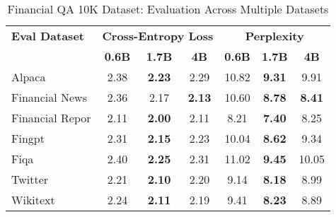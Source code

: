 
\begin{table}[h]
\centering
\caption[Financial QA 10K: Evaluation Results]{Financial QA 10K Dataset: Evaluation Across Multiple Datasets}
\label{tab:financial_qa_results}
\begin{tabular}{l|ccc|ccc}
\hline
\textbf{Eval Dataset} & \multicolumn{3}{c|}{\textbf{Cross-Entropy Loss}} & \multicolumn{3}{c}{\textbf{Perplexity}} \\
\cline{2-4} \cline{5-7}
  & \textbf{0.6B} & \textbf{1.7B} & \textbf{4B} & \textbf{0.6B} & \textbf{1.7B} & \textbf{4B} \\
Alpaca & 2.38 & \textbf{2.23} & 2.29 & 10.82 & \textbf{9.31} & 9.91 \\
Financial News & 2.36 & 2.17 & \textbf{2.13} & 10.60 & \textbf{8.78} & \textbf{8.41} \\
Financial Repor & 2.11 & \textbf{2.00} & 2.11 & 8.21 & \textbf{7.40} & 8.25 \\
Fingpt & 2.31 & \textbf{2.15} & 2.23 & 10.04 & \textbf{8.62} & 9.34 \\
Fiqa & 2.40 & \textbf{2.25} & 2.31 & 11.02 & \textbf{9.45} & 10.05 \\
Twitter & 2.21 & \textbf{2.10} & 2.20 & 9.14 & \textbf{8.18} & 8.99 \\
Wikitext & 2.24 & \textbf{2.11} & 2.19 & 9.41 & \textbf{8.23} & 8.89 \\
\hline
\end{tabular}
\end{table}

